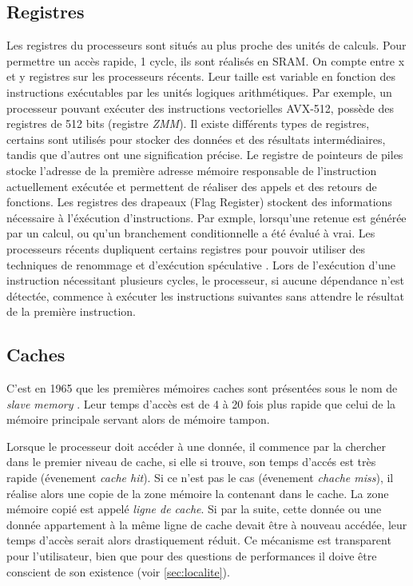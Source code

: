 \subsection{Registres}
Les registres du processeurs sont situés au plus proche des unités de calculs. Pour permettre un accès rapide, 1 cycle, ils sont réalisés en SRAM. On compte entre x et y registres sur les processeurs récents. Leur taille est variable en fonction des instructions exécutables par les unités logiques arithmétiques. Par exemple, un processeur pouvant exécuter des instructions vectorielles AVX-512, possède des registres de 512 bits (registre \textit{ZMM}). Il existe différents types de registres, certains sont utilisés pour stocker des données et des résultats intermédiaires, tandis que d’autres ont une signification précise. Le registre de pointeurs de piles stocke l’adresse de la première adresse mémoire responsable de l’instruction actuellement exécutée et permettent de réaliser des appels et des retours de fonctions. Les registres des drapeaux (Flag Register) stockent des informations nécessaire à l’éxécution d’instructions. Par exmple, lorsqu’une retenue est générée par un calcul, ou qu’un branchement conditionnelle a été évalué à vrai. Les processeurs récents dupliquent certains registres pour pouvoir utiliser des techniques de renommage \cite{moudgill1993register} et d'exécution spéculative \cite{chou2004efficient}. Lors de l'exécution d'une instruction nécessitant plusieurs cycles, le processeur, si aucune dépendance n'est détectée, commence à exécuter les instructions suivantes sans attendre le résultat de la première instruction.



\subsection{Caches}
C’est en 1965 que les premières mémoires caches sont présentées sous le nom de \textit{slave memory} \cite{wilkes1965slave}. Leur temps d’accès est de 4 à 20 fois plus rapide que celui de la mémoire principale servant alors de mémoire tampon. 

Lorsque le processeur doit accéder à une donnée, il commence par la chercher dans le premier niveau de cache, si elle si trouve, son temps d'accés est très rapide (évenement \textit{cache hit}). Si ce n’est pas le cas (évenement \textit{chache miss}), il réalise alors une copie de la zone mémoire la contenant dans le cache. La zone mémoire copié est appelé \textit{ligne de cache}. Si par la suite, cette donnée ou une donnée appartement à la même ligne de cache devait être à nouveau accédée, leur temps d’accès serait alors drastiquement réduit. Ce mécanisme est transparent pour l’utilisateur, bien que pour des questions de performances il doive être conscient de son existence (voir \autoref{sec:localite}). 

